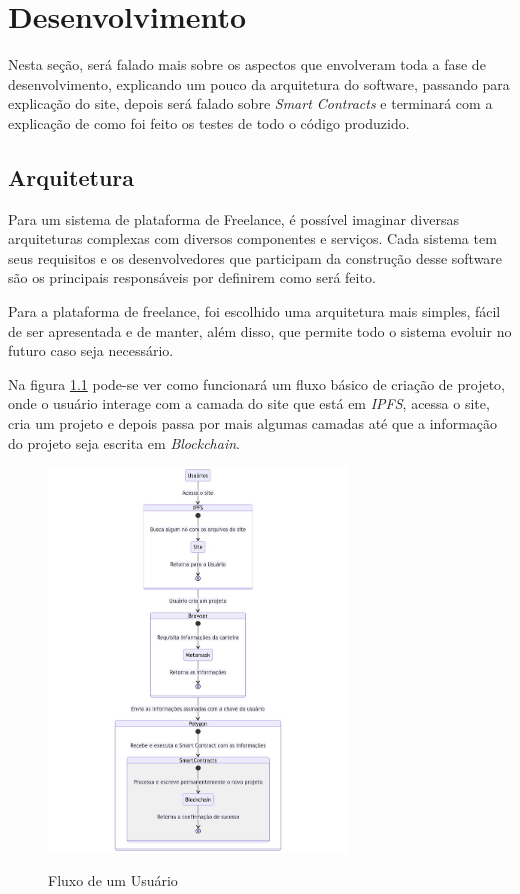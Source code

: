 \chapter{Desenvolvimento}

Nesta seção, será falado mais sobre os aspectos que envolveram toda a fase de desenvolvimento, explicando um pouco da arquitetura do software, passando para explicação do site, depois será falado sobre \textit{Smart Contracts} e terminará com a explicação de como foi feito os testes de todo o código produzido.

\section{Arquitetura}

Para um sistema de plataforma de Freelance, é possível imaginar diversas arquiteturas complexas com diversos componentes e serviços. Cada sistema tem seus requisitos e os desenvolvedores que participam da construção desse software são os principais responsáveis por definirem como será feito.

Para a plataforma de freelance, foi escolhido uma arquitetura mais simples, fácil de ser apresentada e de manter, além disso, que permite todo o sistema evoluir no futuro caso seja necessário.

Na figura \ref{fig:architecture_fig} pode-se ver como funcionará um fluxo básico de criação de projeto, onde o usuário interage com a camada do site que está em \textit{IPFS}, acessa o site, cria um projeto e depois passa por mais algumas camadas até que a informação do projeto seja escrita em \textit{Blockchain}.

\begin{figure}[h!]
  \centering
  \caption{Fluxo de um Usuário}
  \includegraphics[width=300px]{src/images/architecture.jpeg}
  \label{fig:architecture_fig}
\end{figure}

